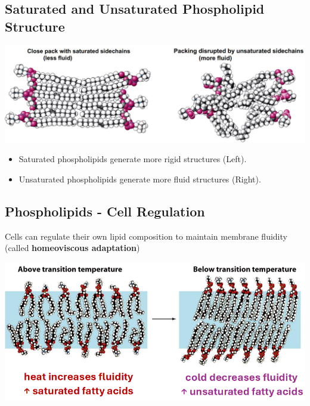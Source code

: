 \documentclass[10pt]{article}
\begin{document}
\subsection*{Saturated and Unsaturated Phospholipid Structure}
\begin{center}
    \includegraphics*[width=\textwidth]{L4_1.png}
\end{center}
\begin{itemize}
    \item Saturated phospholipids generate more rigid structures (Left). 
    \item Unsaturated phospholipids generate more fluid structures (Right).
\end{itemize}

\subsection*{Phospholipids - Cell Regulation}
Cells can regulate their own lipid composition to maintain membrane fluidity (called \textbf{homeoviscous adaptation})
\begin{center}
    \includegraphics*[width=\textwidth]{L4_2.png}
\end{center}
\end{document}
